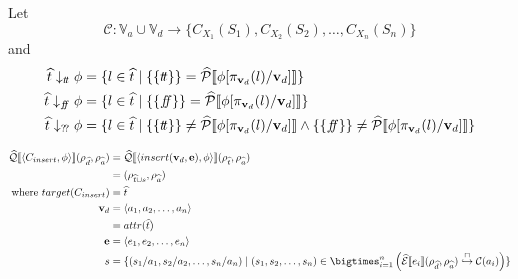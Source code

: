 Let
\begin{equation}
    \mathcal{C} : \mathbb{V}_a \cup \mathbb{V}_d \rightarrow \{ C_{X_1}(S_1), C_{X_2}(S_2), \dots, C_{X_n}(S_n) \}
\end{equation}
and
\begin{align}
    \abstable \downarrow_{\true} \phi &= \{ l \in \ab{t} \mid \{\{ \true \}\} = \abspredsem{\phi[\pi_{\mathbf{v}_d}(l)/\mathbf{v}_d]} \} \\
    \abstable \downarrow_{\false} \phi &= \{ l \in \ab{t} \mid \{\{ \false \}\} = \abspredsem{\phi[\pi_{\mathbf{v}_d}(l)/\mathbf{v}_d]} \} \\
    \abstable \downarrow_{\unknown} \phi &= \{ l \in \ab{t} \mid \{\{ \true \}\} \neq \abspredsem{\phi[\pi_{\mathbf{v}_d}(l)/\mathbf{v}_d]} \land \{\{ \false \}\} \neq \abspredsem{\phi[\pi_{\mathbf{v}_d}(l)/\mathbf{v}_d]}\} \\
\end{align}

\begin{align}
    \abssqlsem{\langle C_{insert}, \phi \rangle}(\rho_{\ab{d}}, \rho_{\ab{a}}) & =
    \abssqlsem{\langle insert(\mathbf{v}_d, \mathbf{e}), \phi \rangle}(\rho_{\ab{t}}, \rho_{\ab{a}})\\
    & = (\rho_{\ab{t} \cup s}, \rho_{\ab{a}}) \\
    \text{where } target(C_{insert})        & = \ab{t}                                                                                                                                                 \\
    \mathbf{v}_d              & = \langle a_1, a_2, \dots, a_n \rangle                                                                                                        \\
                                               & = attr(\ab{t})                                                                                                                                           \\
    \mathbf{e} & = \langle e_1, e_2, \dots, e_n \rangle \\
    s &= \{ (s_1/a_1, s_2/a_2, \dots, s_n/a_n) \mid (s_1, s_2, \dots, s_n) \in \bigtimes_{i = 1}^{n} \left( \absexpsem{e_i}(\rho_{\ab{d}}, \rho_{\ab{a}}) \into \lookupcl(a_i) \right) \}
\end{align}


